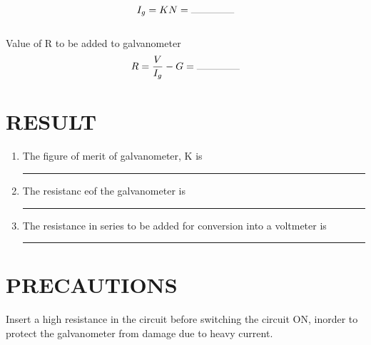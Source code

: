 \documentclass[11pt,a4paper]{article}
\begin{document}
	$$I_g = KN = \rule{10ex}{0.2pt}$$\\ 
	Value of R to be added to galvanometer\\
	$$R = \dfrac{V}{I_g} - G  = \rule{10ex}{0.2pt}$$
		\section{RESULT}
	\begin{enumerate}
		\item 	The figure of merit of galvanometer, K is \rule{20ex}{0.2pt}
		\item 	The resistanc eof the galvanometer is  \rule{20ex}{0.2pt}
		\item 	The resistance in series to be added for conversion into a voltmeter is  \rule{20ex}{0.2pt}
\end{enumerate}

	\section{PRECAUTIONS}
	Insert a high resistance in the circuit before switching the circuit ON, inorder to protect the galvanometer from damage due to heavy current.
		
	
\end{document}

